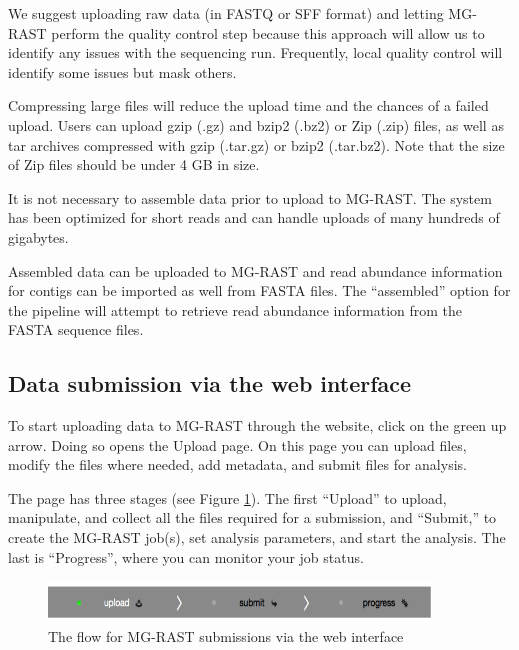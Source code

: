 \documentclass[12pt,fullpage]{report}
\begin{document}
We suggest uploading raw data (in FASTQ or SFF format) and letting MG-RAST perform the quality control step because
this approach will allow us to identify any issues with the sequencing run. Frequently, local quality control will identify some
issues but mask others.

Compressing large files will reduce the upload time and the chances of a failed upload. Users can upload gzip (.gz) and bzip2 (.bz2) or Zip (.zip) files, as well as tar archives compressed with gzip (.tar.gz) or bzip2 (.tar.bz2). Note that the size of Zip files should be under 4 GB in size.

It is not necessary to assemble data prior to upload to MG-RAST. The system has been optimized for short reads and can handle uploads of many hundreds of gigabytes.

Assembled data can be uploaded to MG-RAST and read abundance information for contigs can be imported as well from FASTA files.
The ``assembled'' option for the pipeline will attempt to retrieve read abundance information from the FASTA sequence files.
\subsection{Data submission via the web interface}

To start uploading data to MG-RAST through the website, click on the green up arrow. Doing so opens the Upload page. On this page you can upload files, modify the files where needed, add metadata, and submit files for analysis.

The page has three stages (see Figure \ref{fig:submission_stages}). The first “Upload” to upload, manipulate, and collect all the files required for a submission, and “Submit,” to create the MG-RAST job(s), set analysis parameters, and start the analysis. The last is “Progress”, where you can monitor your job status.
\begin{figure}
\begin{center} 
\includegraphics[width=4in]{Images/submission_stages.png} 
\end{center} 
\label{fig:submission_stages} 
\caption{The flow for MG-RAST submissions via the web interface}
\end{figure}
\end{document}
